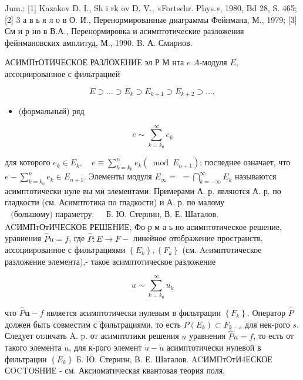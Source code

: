 \documentclass[10pt]{article}
\begin{document}
Jum.: [1] Kazakov D. I., Sh i rk ov D. V., «Fortschr. Phys.», 1980, Bd 28, S. 465; [2] 3 а в ь я л о в О. И., Перенормированные диаграммы Фейнмана, М., 1979; [3] См и р но в В.А., Перенормировка и асимптотические разложения фейнмановских амплитуд, М., 1990. B. А. Смирнов.



АСИМПтОТИЧЕСКОЕ РАЗЛОХЕНИЕ эл Р М нта $e$ $A$-модуля $E$, ассоциированное с фильтрацией



\[

E \supset \ldots \supset E_{k} \supset E_{k+1} \supset E_{k+2} \supset \ldots,

\]



\begin{itemize}

  \item (формальный) ряд

\end{itemize}



\[

e \sim \sum_{k=k_{0}}^{\infty} e_{k}

\]



для которого $e_{k} \in E_{k}, \quad e \equiv \sum_{k=k_{0}}^{n} e_{k}\left(\bmod E_{n+1}\right)$; последнее означает, что $e-\sum_{k=k_{0}}^{n} e_{k} \in E_{n+1}$. Элементы модуля $E_{\infty}=$ $=\bigcap_{k=-\infty}^{\infty} E_{k}$ называются асимптотически нуле вы ми элементами. Примерами А. р. являются А. р. по гладкости (см. Асимптотика по гладкости) и А. р. по малому $\begin{array}{ll}\text { (большому) параметру. } & \text { Б. Ю. Стернин, В. Е. Шаталов. }\end{array}$ ACИМПтОтИЧЕСКОЕ РЕШЕНИЕ, Фо р м а ь но асимптотическое решение, уравнения $\hat{P} u=f$, где $\hat{P}: E \rightarrow F-$ линейное отображение пространств, ассоциированное с фильтрациями $\left\{E_{k}\right\},\left\{F_{k}\right\}$ (см. Acимптотическое разложение элемента),- такое асимптотическое разложение



\[

u \sim \sum_{k=k_{0}}^{\infty} u_{k}

\]



что $\hat{P} \boldsymbol{u}-f$ является асимптотически нулевым в фильтрации $\left\{F_{k}\right\}$. Оператор $\hat{P}$ должен быть совместим с фильтрациями, то есть $P\left(E_{k}\right) \subset F_{k-s}$ для нек-рого $s$. Следует отличать A. p. от асимптотики решения $u$ уравнения $\hat{P} u=f$, то есть от такого элемента $\tilde{u}$, для к-рого элемент $u-\tilde{u}$ асимптотически нулевой в фильтрации $\left\{E_{k}\right\}$ Б. Ю. Стернин, В. Е. Шаталов. ACИМПтОтИ4ЕСКОЕ СOCTOSHИЕ - см. Аксиоматическая квантовая теория поля.
\end{document}
